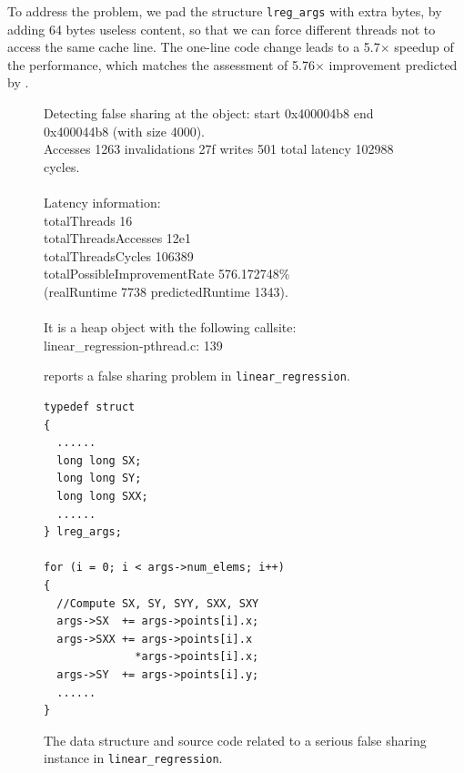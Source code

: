 To address the problem, we pad the structure {\tt lreg\_args} with extra bytes, by adding 64 bytes useless content, so that we can force different threads not to access the same cache line. The one-line code change leads to a 5.7$\times$ speedup of the performance, which matches the assessment of 5.76$\times$ improvement predicted by \cheetah{}.

\begin{figure}
\begin{minipage}{\columnwidth}

\centering

\fbox
{
\begin{minipage}{3in}
Detecting false sharing at the object: start 0x400004b8 end 0x400044b8 (with size 4000). \\
Accesses 1263 invalidations 27f writes 501 total latency 102988 cycles.\\
\\
Latency information: \\
totalThreads 16 \\
totalThreadsAccesses 12e1 \\
totalThreadsCycles 106389 \\
totalPossibleImprovementRate 576.172748\% \\
(realRuntime 7738 predictedRuntime 1343).\\
\\
It is a heap object with the following callsite:\\
linear\_regression-pthread.c: 139
\end{minipage}
}
\vspace{1em}
\caption{\cheetah{} reports a false sharing problem in \texttt{linear\_regression}.}
\label{fig:lr}
\end{minipage}
\end{figure}


\begin{figure}
\begin{verbatim}
typedef struct
{
  ......  
  long long SX;
  long long SY;
  long long SXX;
  ......
} lreg_args;	

for (i = 0; i < args->num_elems; i++)
{
  //Compute SX, SY, SYY, SXX, SXY
  args->SX  += args->points[i].x;
  args->SXX += args->points[i].x
              *args->points[i].x;
  args->SY  += args->points[i].y;
  ......
}
\end{verbatim}
\caption{The data structure and source code related to a serious false sharing instance in \texttt{linear\_regression}.}
\label{lr:code}
\end{figure}

